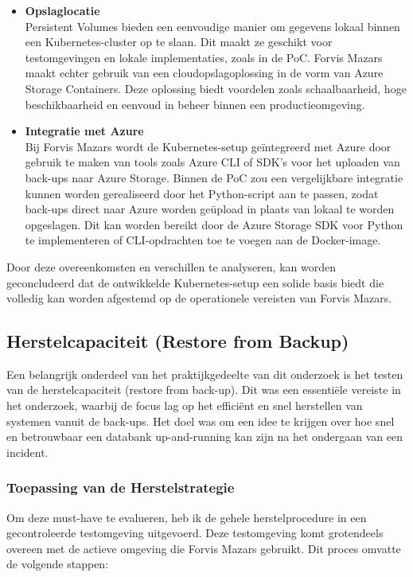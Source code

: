 \begin{itemize}
    \item \textbf{Opslaglocatie} \\
    Persistent Volumes bieden een eenvoudige manier om gegevens lokaal binnen een Kubernetes-cluster op te slaan. Dit maakt ze geschikt voor testomgevingen en lokale implementaties, zoals in de PoC. Forvis Mazars maakt echter gebruik van een cloudopslagoplossing in de vorm van Azure Storage Containers. Deze oplossing biedt voordelen zoals schaalbaarheid, hoge beschikbaarheid en eenvoud in beheer binnen een productieomgeving.
    
    \item \textbf{Integratie met Azure} \\
    Bij Forvis Mazars wordt de Kubernetes-setup geïntegreerd met Azure door gebruik te maken van tools zoals Azure CLI of SDK’s voor het uploaden van back-ups naar Azure Storage. Binnen de PoC zou een vergelijkbare integratie kunnen worden gerealiseerd door het Python-script aan te passen, zodat back-ups direct naar Azure worden geüpload in plaats van lokaal te worden opgeslagen. Dit kan worden bereikt door de Azure Storage SDK voor Python te implementeren of CLI-opdrachten toe te voegen aan de Docker-image.
\end{itemize}

Door deze overeenkomsten en verschillen te analyseren, kan worden geconcludeerd dat de ontwikkelde Kubernetes-setup een solide basis biedt die volledig kan worden afgestemd op de operationele vereisten van Forvis Mazars.



\subsection{Herstelcapaciteit (Restore from Backup)}
Een belangrijk onderdeel van het praktijkgedeelte van dit onderzoek is het testen van de herstelcapaciteit (restore from back-up). Dit was een essentiële vereiste in het onderzoek, waarbij de focus lag op het efficiënt en snel herstellen van systemen vanuit de back-ups. Het doel was om een idee te krijgen over hoe snel en betrouwbaar een databank up-and-running kan zijn na het ondergaan van een incident.

\subsubsection{Toepassing van de Herstelstrategie}
Om deze must-have te evalueren, heb ik de gehele herstelprocedure in een gecontroleerde testomgeving uitgevoerd. Deze testomgeving komt grotendeels overeen met de actieve omgeving die Forvis Mazars gebruikt. Dit proces omvatte de volgende stappen:

